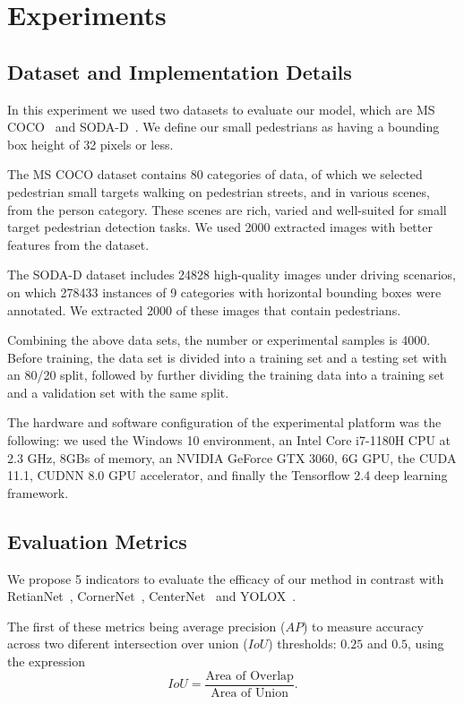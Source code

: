 \section{Experiments}
\label{sec:experiments}


\subsection{Dataset and Implementation Details}

In this experiment we used two datasets to evaluate our model, which are MS
COCO~\cite{lin2014microsoft} and SODA-D~\cite{cheng2023towards}. We define our
small pedestrians as having a bounding box height of 32 pixels or less.

The MS COCO dataset contains 80 categories of data, of which we selected
pedestrian small targets walking on pedestrian streets, and in various scenes,
from the person category. These scenes are rich, varied and well-suited for
small target pedestrian detection tasks. We used 2000 extracted images with
better features from the dataset.

The SODA-D dataset includes 24828 high-quality images under driving scenarios,
on which 278433 instances of 9 categories with horizontal bounding boxes were
annotated. We extracted 2000 of these images that contain pedestrians.

Combining the above data sets, the number or experimental samples is 4000.
Before training, the data set is divided into a training set and a testing set
with an 80/20 split, followed by further dividing the training data into a
training set and a validation set with the same split.

The hardware and software configuration of the experimental platform was the
following: we used the Windows 10 environment, an Intel Core i7-1180H CPU at
2.3 GHz, 8GBs of memory, an NVIDIA GeForce GTX 3060, 6G GPU, the CUDA 11.1,
CUDNN 8.0 GPU accelerator, and finally the Tensorflow 2.4 deep learning
framework.

\subsection{Evaluation Metrics}

We propose 5 indicators to evaluate the efficacy of our method in contrast with
RetianNet~\cite{lin2017focal}, CornerNet~\cite{law2018corner},
CenterNet~\cite{zhou2019objects} and YOLOX~\cite{ge2021yolox}.

The first of these metrics being average precision ($AP$) to measure accuracy
across two diferent intersection over union ($IoU$) thresholds: $0.25$ and
$0.5$, using the expression
\[
	IoU = \frac{\text{Area of Overlap}}{\text{Area of Union}}.
\]

